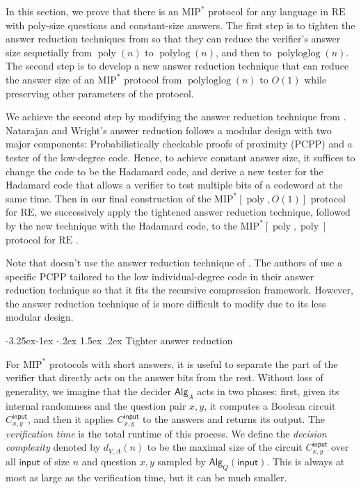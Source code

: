 \documentclass[11pt]{article}
\makeatletter
\renewcommand{\subsection}{\@startsection{subsection}{2}{\z@}%
             {-3.25ex\@plus -1ex \@minus -.2ex}%
             {1.5ex \@plus .2ex}%
             {\normalfont\large\scshape\bfseries}}
\theoremstyle{plain}
\theoremstyle{definition}
\newcommand{\poly} {\ensuremath{\operatorname{poly}}}
\newcommand{\polylog} {\ensuremath{\operatorname{polylog}}}
\newcommand{\polyloglog} {\ensuremath{\operatorname{polyloglog}}}
\newcommand{\1}{\mathbb{1}} %
\newcommand{\PCPP}{\mathrm{PCPP}}
\newcommand{\ipt}{\mathsf{input}}
\newcommand{\Alg}{\mathsf{Alg}}
\newcommand{\MIP}{\mathrm{MIP}}
\newcommand{\RE}{\mathrm{RE}}
\makeatother
\begin{document}
In this section, we prove that there is an $\MIP^\ast$ protocol for any language in $\RE$ with poly-size questions and constant-size answers.
The first step is to tighten the answer reduction techniques from \cite{JNVWY'20,10.1145/3564246.3585208} so that they can reduce the verifier's answer size sequetially from $\poly(n)$ to $\polylog(n)$, and then to $\polyloglog(n)$. 
The second step is to develop a new answer reduction technique that can reduce the answer size of an $\MIP^\ast$ protocol from $\polyloglog(n)$ to $O(1)$ while preserving other parameters of the protocol.

We achieve the second step by modifying the answer reduction technique from \cite{neexp}.
Natarajan and Wright's answer reduction follows a modular design with two major components: Probabilistically checkable proofs of proximity ($\PCPP$) and a tester of the low-degree code.
Hence, to achieve constant answer size, it suffices to change the code to be the Hadamard code, and derive a new tester for the Hadamard code
that allows a verifier to test multiple bits of a codeword at the same time.
Then in our final construction of the $\MIP^\ast[\poly, O(1)]$ protocol for $\RE$, we successively apply the tightened answer reduction technique, followed by the new technique with the Hadamard code, to the $\MIP^\ast[\poly, \poly]$ protocol for $\RE$ \cite{JNVWY'20}. 

Note that \cite{JNVWY'20} doesn't use the answer reduction technique of \cite{neexp}. 
The authors of \cite{JNVWY'20} use a specific $\PCPP$ tailored to the low individual-degree code in their answer reduction technique so that it fits the recursive compression framework.
However, the answer reduction technique of \cite{JNVWY'20} is more difficult to modify due to its less modular design.


\subsection{Tighter answer reduction}

For $\MIP^*$ protocols with short answers, it is useful to separate the part of the verifier that directly acts on the answer bits from the rest. Without loss of generality, we imagine that the decider $\Alg_A$ acts in two phases: first, given its internal randomness and the question pair $x,y$, it computes a Boolean circuit $C^{\ipt}_{x,y} $, and then it applies $C^{\ipt}_{x,y}$ to the answers and returns its output. The \emph{verification time} is the total runtime of this process. We define the \emph{decision complexity} denoted by $d_{V,A}(n)$ to be the maximal size of the circuit $C^{\ipt}_{x,y}$ over all $\ipt$ of size $n$ and question $x,y$ sampled by $\Alg_Q(\ipt)$.
This is always at most as large as the verification time, but it can be much smaller. 
\end{document}
